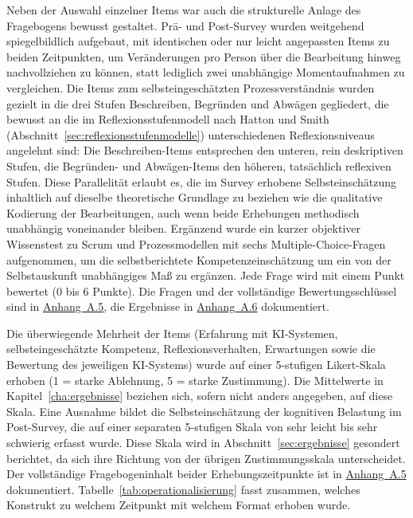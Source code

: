 Neben der Auswahl einzelner Items war auch die strukturelle Anlage des Fragebogens bewusst gestaltet.
Prä- und Post-Survey wurden weitgehend spiegelbildlich aufgebaut, mit identischen oder nur leicht
angepassten Items zu beiden Zeitpunkten, um Veränderungen pro Person über die Bearbeitung hinweg
nachvollziehen zu können, statt lediglich zwei unabhängige Momentaufnahmen zu vergleichen. Die Items
zum selbsteingeschätzten Prozessverständnis wurden gezielt in die drei Stufen Beschreiben, Begründen
und Abwägen gegliedert, die bewusst an die im Reflexionsstufenmodell nach Hatton und Smith
(Abschnitt~\ref{sec:reflexionsstufenmodelle}) unterschiedenen Reflexionsniveaus angelehnt sind: Die
Beschreiben-Items entsprechen den unteren, rein deskriptiven Stufen, die Begründen- und
Abwägen-Items den höheren, tatsächlich reflexiven Stufen. Diese Parallelität erlaubt es, die im
Survey erhobene Selbsteinschätzung inhaltlich auf dieselbe theoretische Grundlage zu beziehen wie die
qualitative Kodierung der Bearbeitungen, auch wenn beide Erhebungen methodisch unabhängig
voneinander bleiben. Ergänzend wurde ein kurzer objektiver Wissenstest zu Scrum und Prozessmodellen
mit sechs Multiple-Choice-Fragen aufgenommen, um die selbstberichtete Kompetenzeinschätzung um ein
von der Selbstauskunft unabhängiges Maß zu ergänzen. Jede Frage wird mit einem Punkt bewertet (0 bis 6
Punkte). Die Fragen und der vollständige Bewertungsschlüssel sind in \hyperref[app:fragebogen]{Anhang~A.5}, die Ergebnisse in
\hyperref[app:statistik]{Anhang~A.6} dokumentiert.

Die überwiegende Mehrheit der Items (Erfahrung mit KI-Systemen, selbsteingeschätzte Kompetenz,
Reflexionsverhalten, Erwartungen sowie die Bewertung des jeweiligen KI-Systems) wurde auf einer
5-stufigen Likert-Skala erhoben (1 = starke Ablehnung, 5 = starke Zustimmung). Die Mittelwerte in
Kapitel~\ref{cha:ergebnisse} beziehen sich, sofern nicht anders angegeben, auf diese Skala. Eine
Ausnahme bildet die Selbsteinschätzung der kognitiven Belastung im Post-Survey, die auf einer separaten
5-stufigen Skala von \glqq sehr leicht\grqq{} bis \glqq sehr schwierig\grqq{} erfasst wurde. Diese
Skala wird in Abschnitt~\ref{sec:ergebnisse} gesondert berichtet, da sich ihre Richtung von der
übrigen Zustimmungsskala unterscheidet. Der
vollständige Fragebogeninhalt beider Erhebungszeitpunkte ist in \hyperref[app:fragebogen]{Anhang~A.5} dokumentiert.
Tabelle~\ref{tab:operationalisierung} fasst zusammen, welches Konstrukt zu welchem Zeitpunkt mit
welchem Format erhoben wurde.

